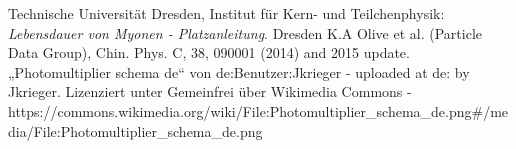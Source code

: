 \begin{thebibliography}{99}
 Technische Universität Dresden,  Institut für Kern- und Teilchenphysik: \textit{Lebensdauer von Myonen - Platzanleitung}. Dresden
 K.A Olive et al. (Particle Data Group), Chin. Phys. C, 38, 090001 (2014) and 2015 update.
 „Photomultiplier schema de“ von de:Benutzer:Jkrieger - uploaded at de: by Jkrieger. Lizenziert unter Gemeinfrei über Wikimedia Commons - https://commons.wikimedia.org/wiki/File:Photomultiplier\_schema\_de.png\#/media/File:Photomultiplier\_schema\_de.png
\end{thebibliography}

